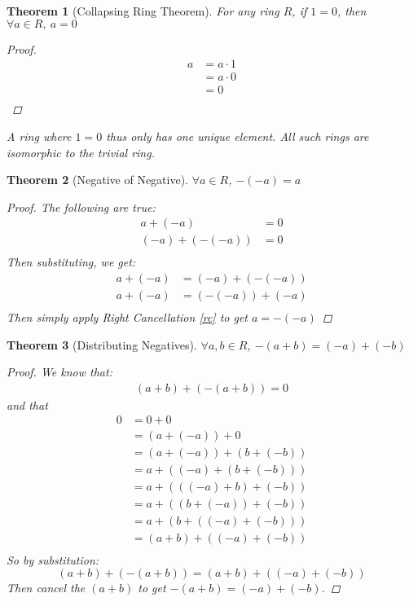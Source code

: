 \documentclass{article}
\newtheorem{thm}{Theorem}
\begin{document}
  \begin{thm}[Collapsing Ring Theorem]\label{cort} For any ring $R$, if $1 = 0$, then $\forall a \in R,\ a = 0$
    \begin{proof}
      \begin{align*}
        a &= a\cdot 1 \\
          &= a\cdot 0 \\
          &= 0 \\
      \end{align*}
    \end{proof}
    A ring where $1 = 0$ thus only has one unique element. All such rings are isomorphic to the trivial ring.
  \end{thm}
  \begin{thm}[Negative of Negative] $\forall a \in R$, $-(-a) = a$
    \begin{proof}
      The following are true:
      \begin{align*}
        a + (-a) &= 0\\
        (-a) + (-(-a)) &= 0\\
      \end{align*}
      Then substituting, we get:
      \begin{align*}
        a + (-a) &= (-a) + (-(-a))\\
        a + (-a) &= (-(-a)) + (-a)\\
      \end{align*}
      Then simply apply Right Cancellation \eqref{rc} to get $a = -(-a)$
    \end{proof}
  \end{thm}
  \begin{thm} [Distributing Negatives] $\forall a, b \in R$, $-(a + b) = (-a) + (-b)$
    \begin{proof}
      We know that:
      \begin{align*}
        (a + b) + (-(a + b)) = 0
      \end{align*}
      and that
      \begin{align*}
        0 &= 0 + 0 \\
          &= (a + (-a)) + 0 \\
          &= (a + (-a)) + (b + (-b)) \\
          &= a + ((-a) + (b + (-b)))\\
          &= a + (((-a) + b) + (-b))\\
          &= a + ((b + (-a)) + (-b))\\
          &= a + (b + ((-a) + (-b)))\\
          &= (a + b) + ((-a) + (-b))\\
      \end{align*}
      So by substitution:
      \begin{equation*}
        (a + b) + (-(a + b)) = (a + b) + ((-a) + (-b))
      \end{equation*}
      Then cancel the $(a+b)$ to get $-(a+b) = (-a) + (-b)$.
    \end{proof}
  \end{thm}
\end{document}
